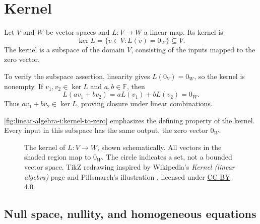 \section{Kernel}
\label{sec:linear-algebra-i:kernel}

\begin{definition}
  Let \(V\) and \(W\) be vector spaces and \(L:V\to W\) a linear map.
  Its kernel is
  \[
    \ker L=\{v\in V:L(v)=0_W\} \subseteq V.
  \]
  The kernel is a subspace of the domain \(V\), consisting of the inputs
  mapped to the zero vector.
\end{definition}

\begin{pendingreview}
To verify the subspace assertion, linearity gives \(L(0_V)=0_W\),
so the kernel is nonempty. If \(v_1,v_2\in\ker L\) and
\(a,b\in\mathbb F\), then
\[
  L(av_1+bv_2)=aL(v_1)+bL(v_2)=0_W.
\]
Thus \(av_1+bv_2\in\ker L\), proving closure under linear combinations.
\end{pendingreview}

\autoref{fig:linear-algebra-i:kernel-to-zero} emphasizes the defining
property of the kernel. Every input in this subspace has the same output,
the zero vector \(0_W\).

\begin{figure}[htbp]
  \centering
  
  \caption[Kernel of a linear map]{The kernel of \(L:V\to W\), shown schematically.
    All vectors in the shaded region map to \(0_W\).
    The circle indicates a set, not a bounded vector space.
    TikZ redrawing inspired by
    Wikipedia's \emph{Kernel (linear algebra)} page
    \cite{WikipediaKernel} and Pillsmarch's illustration
    \cite{PillsmarchKernelImage},
    licensed under \href{https://creativecommons.org/licenses/by/4.0/}{CC BY 4.0}.}
  \label{fig:linear-algebra-i:kernel-to-zero}
\end{figure}

\subsection{Null space, nullity, and homogeneous equations}

